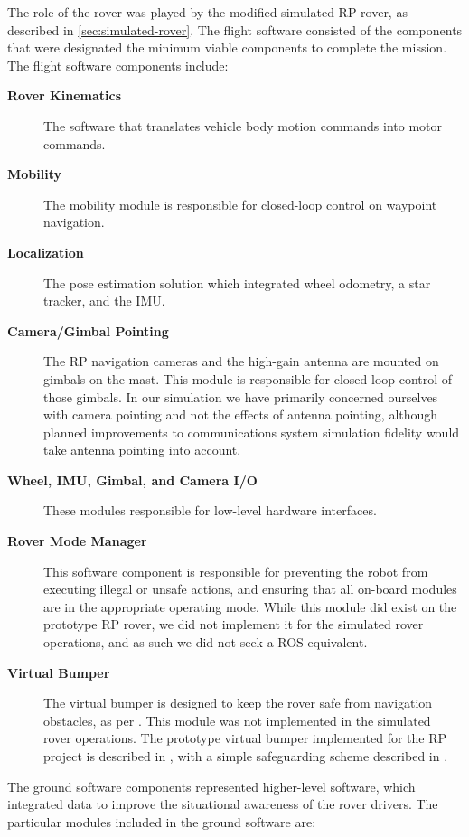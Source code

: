 \documentclass[twocolumn,letterpaper]{IEEEAerospaceCLS}  %
\begin{document}
The role of the rover was played by the modified simulated RP rover, as described in \cref{sec:simulated-rover}.  The flight software consisted of the components that were designated the minimum viable components to complete the mission.  The flight software components include:

\begin{description}
\item[\textbf{Rover Kinematics}] The software that translates vehicle body motion commands into motor commands.
\item[\textbf{Mobility}] The mobility module is responsible for closed-loop control on waypoint navigation.
\item[\textbf{Localization}]  The pose estimation solution which integrated wheel odometry, a star tracker, and the IMU.  
\item[\textbf{Camera/Gimbal Pointing}] The RP navigation cameras and the high-gain antenna are mounted on gimbals on the mast.
This module is responsible for closed-loop control of those gimbals.  
In our simulation we have primarily concerned ourselves with camera pointing and not the effects of antenna pointing, although planned improvements to communications system simulation fidelity would take antenna pointing into account.  
\item[\textbf{Wheel, IMU, Gimbal, and Camera I/O}]  These modules responsible for low-level hardware interfaces.  
\item[\textbf{Rover Mode Manager}] This software component is responsible for preventing the robot from executing illegal or unsafe actions, and ensuring that all on-board modules are in the appropriate operating mode.  
While this module did exist on the prototype RP rover, we did not implement it for the simulated rover operations, and as such we did not seek a ROS equivalent.
\item[\textbf{Virtual Bumper}]  The virtual bumper is designed to keep the rover safe from navigation obstacles, as per \cite{matthies1997fast}. 
This module was not implemented in the simulated rover operations. 
The prototype virtual bumper implemented for the RP project is described in \cite{nefian2017structured}, with a simple safeguarding scheme described in \cite{furlong2016safeguarding}.
\end{description}


The ground software components represented higher-level software, which integrated data to improve the situational awareness of the rover drivers.  
The particular modules included in the ground software are:
\end{document}
